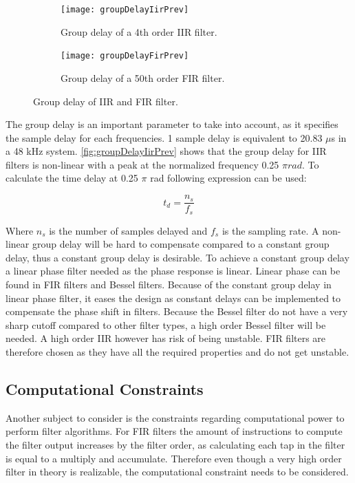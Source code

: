 \begin{figure}[H]
\centering
\begin{subfigure}[t]{0.435\textwidth}
\texttt{[image: groupDelayIirPrev]}
	\caption{Group delay of a 4th order IIR filter.}
	\label{fig:groupDelayIirPrev}
\end{subfigure}
\hspace{6mm} 
\begin{subfigure}[t]{0.47\textwidth}
\texttt{[image: groupDelayFirPrev]}
	\caption{Group delay of a 50th order FIR filter.}
	\label{fig:groupDelayFirPrev}
\end{subfigure}
\caption{Group delay of IIR and FIR filter.}
\label{fig:filterGroupDelay}
\end{figure}

The group delay is an important parameter to take into account, as it specifies the sample delay for each frequencies. 1 sample delay is equivalent to 20.83 $\mu$s in a 48 kHz system. \autoref{fig:groupDelayIirPrev} shows that the group delay for IIR filters is non-linear with a peak at the normalized frequency 0.25 $\pi rad$. To calculate the time delay at 0.25 $\pi$ rad following expression can be used:

\begin{equation}
t_{d}= \frac{n_{s}}{f_s}
\end{equation}

Where $n_{s}$ is the number of samples delayed and $f_s$ is the sampling rate. A non-linear group delay will be hard to compensate compared to a constant group delay, thus a constant group delay is desirable. To achieve a constant group delay a linear phase filter needed as the phase response is linear. Linear phase can be found in FIR filters and Bessel filters. Because of the constant group delay in linear phase filter, it eases the design as constant delays can be implemented to compensate the phase shift in filters. Because the Bessel filter do not have a very sharp cutoff compared to other filter types, a high order Bessel filter will be needed. A high order IIR however has risk of being unstable. FIR filters are therefore chosen as they have all the required properties and do not get unstable.


\subsection*{Computational Constraints}
Another subject to consider is the constraints regarding computational power to perform filter algorithms. For FIR filters the amount of instructions to compute the filter output increases by the filter order, as calculating each tap in the filter is equal to a multiply and accumulate. Therefore even though a very high order filter in theory is realizable, the computational constraint needs to be considered. 

